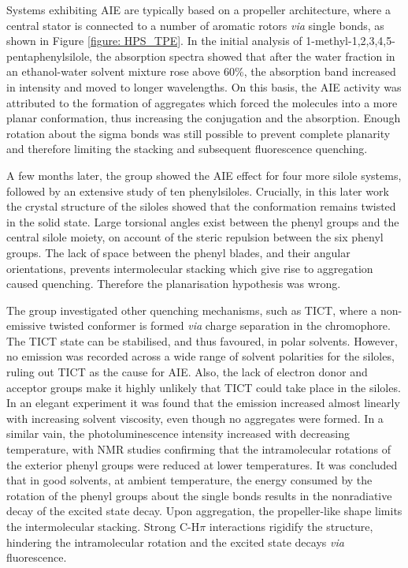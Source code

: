 Systems exhibiting \ac{AIE} are typically based on a propeller architecture, where a central stator is connected to a number of aromatic rotors \textit{via} single bonds, as shown in Figure \ref{figure: HPS_TPE}. In the initial analysis of 1-methyl-1,2,3,4,5-pentaphenylsilole, the absorption spectra showed that after the water fraction in an ethanol-water solvent mixture rose above 60\%, the absorption band increased in intensity and moved to longer wavelengths.\cite{Luo2001} On this basis, the \ac{AIE} activity was attributed to the formation of aggregates which forced the molecules into a more planar conformation, thus increasing the conjugation and the absorption. Enough rotation about the sigma bonds was still possible to prevent complete planarity and therefore limiting the stacking and subsequent fluorescence quenching. 

A few months later, the group showed the \ac{AIE} effect for four more silole systems, followed by an extensive study of ten phenylsiloles.\cite{Tang2001,Chen2003} Crucially, in this later work the crystal structure of the siloles showed that the conformation remains twisted in the solid state.\cite{Chen2003} Large torsional angles exist between the phenyl groups and the central silole moiety, on account of the steric repulsion between the six phenyl groups. The lack of space between the phenyl blades, and their angular orientations, prevents intermolecular stacking which give rise to aggregation caused quenching. Therefore the planarisation hypothesis was wrong. 

The group investigated other quenching mechanisms, such as \ac{TICT}, where a non-emissive twisted conformer is formed \textit{via} charge separation in the chromophore. The \ac{TICT} state can be stabilised, and thus favoured, in polar solvents. However, no emission was recorded across a wide range of solvent polarities for the siloles, ruling out \ac{TICT} as the cause for \ac{AIE}. Also, the lack of electron donor and acceptor groups make it highly unlikely that \ac{TICT} could take place in the siloles. In an elegant experiment it was found that the emission increased almost linearly with increasing solvent viscosity, even though no aggregates were formed. In a similar vain, the photoluminescence intensity increased with decreasing temperature, with NMR studies confirming that the intramolecular rotations of the exterior phenyl groups were reduced at lower temperatures. It was concluded that in good solvents, at ambient temperature, the energy consumed by the rotation of the phenyl groups about the single bonds results in the nonradiative decay of the excited state decay. Upon aggregation, the propeller-like shape limits the intermolecular stacking. Strong C-H\textperiodcentered\textperiodcentered\textperiodcentered$\pi$ interactions rigidify the structure, hindering the intramolecular rotation and the excited state decays \textit{via} fluorescence.\cite{Chen2003}

